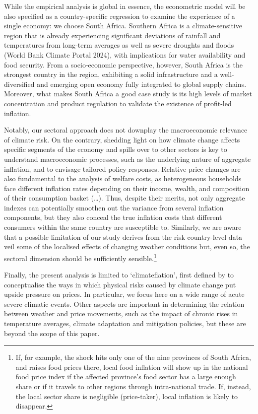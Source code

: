 \documentclass[
  letterpaper,
  DIV=11,
  numbers=noendperiod]{scrartcl}
\begin{document}
While the empirical analysis is global in essence, the econometric model
will be also specified as a country-specific regression to examine the
experience of a single economy: we choose South Africa. Southern Africa
is a climate-sensitive region that is already experiencing significant
deviations of rainfall and temperatures from long-term averages as well
as severe droughts and floods (World Bank Climate Portal 2024), with
implications for water availability and food security. From a
socio-economic perspective, however, South Africa is the strongest
country in the region, exhibiting a solid infrastructure and a
well-diversified and emerging open economy fully integrated to global
supply chains. Moreover, what makes South Africa a good case study is
its high levels of market concentration and product regulation to
validate the existence of profit-led inflation.

Notably, our sectoral approach does not downplay the macroeconomic
relevance of climate risk. On the contrary, shedding light on how
climate change affects specific segments of the economy and spills over
to other sectors is key to understand macroeconomic processes, such as
the underlying nature of aggregate inflation, and to envisage tailored
policy responses. Relative price changes are also fundamental to the
analysis of welfare costs, as heterogeneous households face different
inflation rates depending on their income, wealth, and composition of
their consumption basket (\ldots). Thus, despite their merits, not only
aggregate indexes can potentially smoothen out the variance from several
inflation components, but they also conceal the true inflation costs
that different consumers within the same country are susceptible to.
Similarly, we are aware that a possible limitation of our study derives
from the risk country-level data veil some of the localised effects of
changing weather conditions but, even so, the sectoral dimension should
be sufficiently sensible.\footnote{If, for example, the shock hits only
  one of the nine provinces of South Africa, and raises food prices
  there, local food inflation will show up in the national food price
  index if the affected province's food sector has a large enough share
  or if it travels to other regions through intra-national trade. If,
  instead, the local sector share is negligible (price-taker), local
  inflation is likely to disappear.}

Finally, the present analysis is limited to `climateflation', first
defined by \citet{schnabel2022} to conceptualise the ways in which
physical risks caused by climate change put upside pressure on prices.
In particular, we focus here on a wide range of acute severe climatic
events. Other aspects are important in determining the relation between
weather and price movements, such as the impact of chronic rises in
temperature averages, climate adaptation and mitigation policies, but
these are beyond the scope of this paper.
\end{document}
